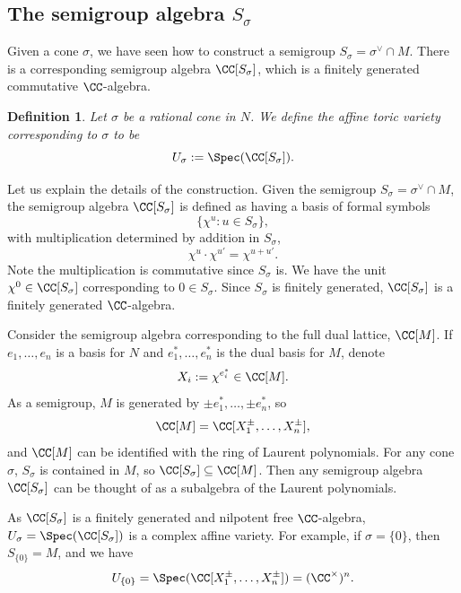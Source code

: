 \documentclass[12pt]{amsart}
\theoremstyle{plain}
\newtheorem{definition}[theorem]{Definition}
\begin{document}
\subsection{The semigroup algebra $S_\sigma$}
Given a cone $\sigma$, we have seen how to construct a semigroup $S_\sigma = \sigma^\vee \cap M$.
There is a corresponding semigroup algebra $\CC[S_\sigma]$, which is a finitely generated commutative $\CC$-algebra.

\begin{definition}
Let $\sigma$ be a rational cone in $N$.
We define the affine toric variety corresponding to $\sigma$ to be
$$U_\sigma := \Spec(\CC[S_\sigma]).$$
\end{definition}

Let us explain the details of the construction.
Given the semigroup $S_\sigma = \sigma^\vee \cap M$, the semigroup algebra $\CC[S_\sigma]$ is defined as having a basis of formal symbols
$$\{\chi^u : u \in S_\sigma\},$$
with multiplication determined by addition in $S_\sigma$,
$$\chi^u \cdot \chi^{u'} = \chi^{u + u'}.$$
Note the multiplication is commutative since $S_\sigma$ is.
We have the unit $\chi^0 \in \CC[S_\sigma]$ corresponding to $0 \in S_\sigma$.
Since $S_\sigma$ is finitely generated, $\CC[S_\sigma]$ is a finitely generated $\CC$-algebra.

Consider the semigroup algebra corresponding to the full dual lattice, $\CC[M]$.
If $e_1, \ldots, e_n$ is a basis for $N$ and $e_1^*, \ldots, e_n^*$ is the dual basis for $M$, denote
$$X_i := \chi^{e_i^*} \in \CC[M].$$
As a semigroup, $M$ is generated by $\pm e_1^*, \ldots, \pm e_n^*$, so
$$\CC[M] = \CC[X_1^\pm, \ldots, X_n^\pm],$$
and $\CC[M]$ can be identified with the ring of Laurent polynomials.
For any cone $\sigma$, $S_\sigma$ is contained in $M$, so $\CC[S_\sigma]\subseteq\CC[M]$. 
Then any semigroup algebra $\CC[S_\sigma]$ can be thought of as a subalgebra of the Laurent polynomials.

As $\CC[S_\sigma]$ is a finitely generated and nilpotent free $\CC$-algebra, $U_\sigma = \Spec(\CC[S_\sigma])$ is a complex affine variety.
For example, if $\sigma = \{0\}$, then $S_{\{0\}}= M$, and we have
$$U_{\{0\}} = \Spec(\CC[X_1^\pm, \ldots, X_n^\pm]) = (\CC^\times)^n.$$
\end{document}
